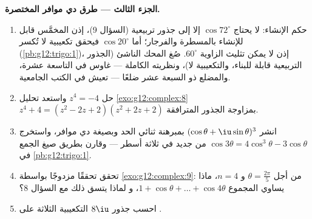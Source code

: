 \begin{problem}
\medskip
\noindent\textbf{الجزء الثالث --- طرق دي موافر المختصرة.}
\begin{enumerate}[resume]
  \item حكم الإنشاء: لا يحتاج $\cos 72^\circ$ إلا إلى
        جذور تربيعية (السؤال 9)، إذن المخمَّس
        قابل للإنشاء بالمسطرة والفرجار؛ أما $\cos 20^\circ$
        فيحقق تكعيبية لا تُكسر
        (\cref{pb:g12:trigo:1})، إذن لا يمكن تثليث الزاوية
        $60^\circ$. صُغ المحك الناشئ (الجذور
        التربيعية قابلة للبناء، والتكعيبية لا)، ونظريته الكاملة ---
        غاوس في التاسعة عشرة، والمضلع ذو السبعة عشر ضلعًا --- تعيش في
        الكتب الجامعية.
  \item حل $z^4 = -4$  واستعد
        تحليل \cref{exo:g12:complex:8}
        $z^4 + 4 = (z^2 - 2z + 2)(z^2 + 2z + 2)$ بمزاوجة
        الجذور المترافقة.
  \item انشر $(\cos\theta + \iu\sin\theta)^3$ بمبرهنة
        ثنائي الحد وبصيغة دي موافر، واستخرج
        $\cos 3\theta = 4\cos^3\theta - 3\cos\theta$ من جديد في ثلاثة
        أسطر --- وقارن بطريق صيغ الجمع في
        \cref{pb:g12:trigo:1}.
  \item تحقق تحققًا مزدوجًا بواسطة \cref{exo:g12:complex:9}: من أجل
        $\theta = \frac{2\pi}{5}$ و $n = 4$، ماذا يساوي
        المجموع $1 + \cos\theta + \dots + \cos 4\theta$، و
        لماذا يتسق ذلك مع السؤال 8؟
  \item احسب جذور $8\iu$ التكعيبية الثلاثة على .
\end{enumerate}


\end{problem}
